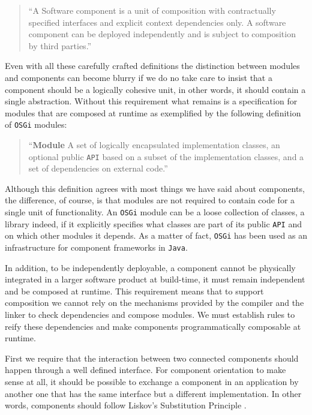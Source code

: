 \begin{quotation}
``A Software component is a unit of composition with contractually specified interfaces and explicit context dependencies only.
A software component can be deployed independently and is subject to composition by third parties.''
\end{quotation}

Even with all these carefully crafted definitions the distinction between modules and components can become blurry if
we do no take care to insist that a component should be a logically cohesive unit, in other words, it should contain
a single abstraction. Without this requirement what remains is a specification for modules that are composed at runtime 
as exemplified by the following definition of \texttt{OSGi} modules: \cite{Hall}

\begin{quotation}
``\textbf{Module} A set of logically encapsulated implementation classes, an optional public \texttt{API} based on a subset
of the implementation classes, and a set of dependencies on external code.''
\end{quotation}

Although this definition agrees with most things we have said about components, the difference, of course, is that modules
are not required to contain code for a single unit of functionality. An \texttt{OSGi} module can be a loose collection of
classes, a library indeed, if it explicitly specifies what classes are part of its public \texttt{API} and on which other
modules it depends. As a matter of fact, \texttt{OSGi} has been used as an infrastructure for component frameworks in \texttt{Java}.

In addition, to be independently deployable, a component cannot be physically integrated in a larger software product at build-time,
it must remain independent and be composed at runtime. This requirement means that to support composition we cannot rely on the
mechanisms provided by the compiler and the linker to check dependencies and compose modules. We must establish rules to reify these
dependencies and make components programmatically composable at runtime. 

First we require that the interaction between two connected components should happen through a well defined interface.
For component orientation to make sense at all, it should be possible to exchange a component in an application by another
one that has the same interface but a different implementation. In other words, components should follow Liskov's
Substitution Principle \cite{Liskov}.

